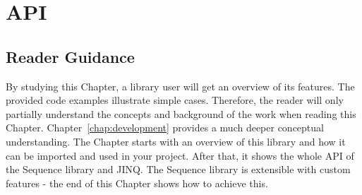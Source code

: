 \chapter{API} %
\label{chap:api}

\section*{Reader Guidance} %
\label{sec:api_reader_guidance}
By studying this Chapter, a library user will get an overview of its features.
The provided code examples illustrate simple cases. Therefore, the reader will
only partially understand the concepts and background of the work when reading
this Chapter. Chapter~\ref{chap:development} provides a much deeper conceptual
understanding. The Chapter starts with an overview of this library and how it
can be imported and used in your project. After that, it shows the whole API of
the Sequence library and JINQ. The Sequence library is extensible with custom
features - the end of this Chapter shows how to achieve this.









